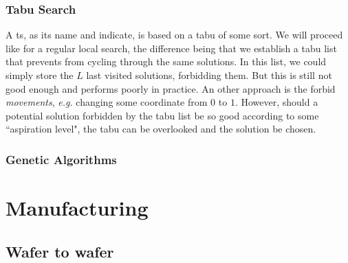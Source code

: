 \documentclass[12pt,a4paper]{article}
\theoremstyle{customdef}
\begin{document}
\subsubsection{Tabu Search}
A \acrlong{ts}, as its name and \cite{Pirlot1996} indicate, is based on a tabu of some sort.
We will proceed like for a regular local search, the difference being that we establish a tabu list that prevents from cycling through the same solutions.
In this list, we could simply store the $L$ last visited solutions, forbidding them.
But this is still not good enough and performs poorly in practice.
An other approach is the forbid \textit{movements}, \textit{e.g.} changing some coordinate from $0$ to $1$.
However, should a potential solution forbidden by the tabu list be so good according to some ``aspiration level", the tabu can be overlooked and the solution be chosen.

\subsubsection{Genetic Algorithms}








\section{Manufacturing}

\subsection{Wafer to wafer}
\end{document}
